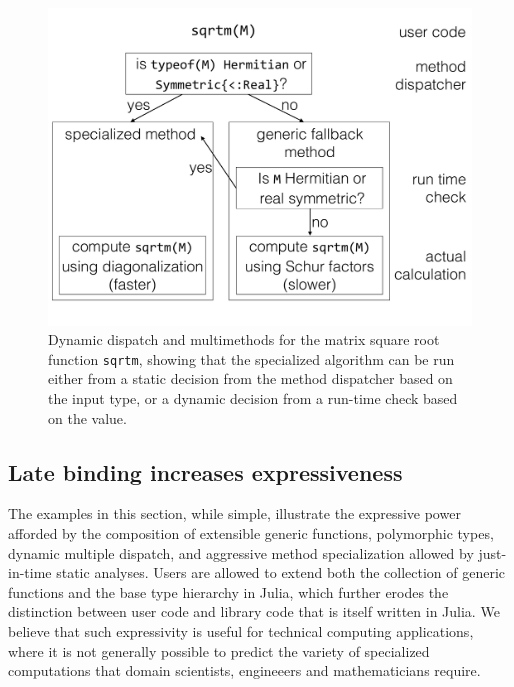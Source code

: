\begin{figure}
	\centering
	\includegraphics[width=\columnwidth]{fig-sqrtm}
	\caption{Dynamic dispatch and multimethods for the matrix square root
		function \texttt{sqrtm}, showing that the specialized algorithm
		can be run either from a static decision from the method
		dispatcher based on the input type, or a dynamic decision from
		a run-time check based on the value.}
	\label{fig:sqrtm}
\end{figure}




\subsection{Late binding increases expressiveness}

The examples in this section, while simple, illustrate the expressive power
afforded by the composition of extensible generic functions, polymorphic types,
dynamic multiple dispatch, and aggressive method specialization allowed by
just-in-time static analyses. Users are allowed to extend both the collection
of generic functions and the base type hierarchy in Julia, which further erodes
the distinction between user code and library code that is itself written in
Julia. We believe that such expressivity is useful for technical computing
applications, where it is not generally possible to predict the variety of
specialized computations that domain scientists, engineeers and mathematicians
require.

